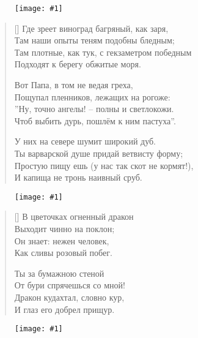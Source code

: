 \documentclass[12pt,a5paper,twoside]{article}
\newcommand{\pict}[1]{\thispagestyle{empty}\begin{figure}[H]\begin{center}\texttt{[image: \#1]}\end{center}\end{figure}\newpage}
\begin{document}
\pict{picts/Gde_zreet_vinograd.png} 


\settowidth{\versewidth}{Где зреет виноград багряный, как заря,}
\begin{verse}[\versewidth]
Где зреет виноград багряный, как заря,\\
Там наши опыты теням подобны бледным;\\
Там плотные, как тук, с гекзаметром победным\\
Подходят к берегу обжитые моря.

Вот Папа, в том не ведая греха,\\
Пощупал пленников, лежащих на рогоже:\\
”Ну, точно ангелы! – полны и светлокожи.\\
Чтоб выбить дурь, пошлём к ним пастуха”.

У них на севере шумит широкий дуб.\\
Ты варварской душе придай ветвисту форму;\\
Простую пищу ешь (у нас так скот не кормят!),\\
И капища не тронь наивный сруб.
\end{verse}
\newpage

\pict{picts/Pro_dobrryx_kitaycev} 

	
\settowidth{\versewidth}{В цветочках огненный дракон}
\begin{verse}[\versewidth]
В цветочках огненный дракон\\
Выходит чинно на поклон;\\
Он знает: нежен человек,\\
Как сливы розовый побег.

Ты за бумажною стеной\\
От бури спрячешься со мной!\\
Дракон кудахтал, словно кур,\\
И глаз его добрел прищур.
\end{verse}
\newpage

\pict{picts/starinnaya_angliyskaya_pesenka} 
	
\end{document}
